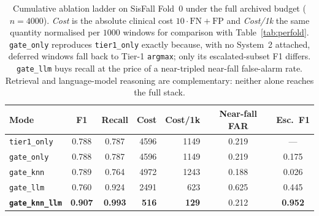 \begin{table}[!t]
\centering
\caption{Cumulative ablation ladder on SisFall Fold~0 under the full archived budget ($n{=}4000$). \emph{Cost} is the absolute clinical cost $10\cdot\mathrm{FN}{+}\mathrm{FP}$ and \emph{Cost/1k} the same quantity normalised per $1000$ windows for comparison with Table~\ref{tab:perfold}. \texttt{gate\_only} reproduces \texttt{tier1\_only} exactly because, with no System~2 attached, deferred windows fall back to Tier-1 \texttt{argmax}; only its escalated-subset F1 differs. \texttt{gate\_llm} buys recall at the price of a near-tripled near-fall false-alarm rate. Retrieval and language-model reasoning are complementary: neither alone reaches the full stack.}
\label{tab:ablation}
\begin{tabular}{lccrrcc}
\toprule
Mode & F1 & Recall & Cost & Cost/1k & Near-fall FAR & Esc.\ F1 \\
\midrule
\texttt{tier1\_only} & 0.788 & 0.787 & 4596 & 1149 & 0.219 & --- \\
\texttt{gate\_only}  & 0.788 & 0.787 & 4596 & 1149 & 0.219 & 0.175 \\
\texttt{gate\_knn}   & 0.789 & 0.764 & 4972 & 1243 & 0.188 & 0.026 \\
\texttt{gate\_llm}   & 0.760 & 0.924 & 2491 & 623  & 0.625 & 0.445 \\
\textbf{\texttt{gate\_knn\_llm}} & \textbf{0.907} & \textbf{0.993} & \textbf{516} & \textbf{129} & 0.212 & \textbf{0.952} \\
\bottomrule
\end{tabular}
\end{table}
